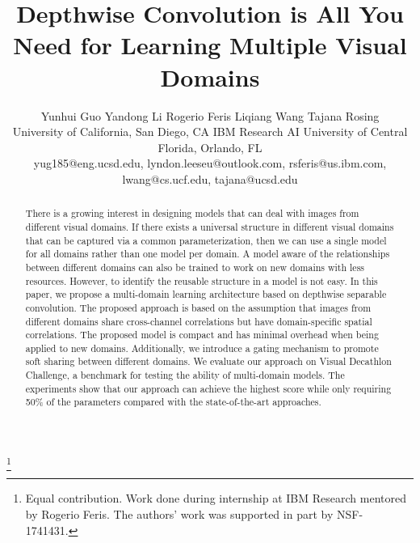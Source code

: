 \documentclass[letterpaper]{article} \usepackage{aaai19}  \usepackage{times}  \usepackage{helvet}  \usepackage{courier}  \usepackage{url}  \usepackage{graphicx}  \usepackage{amssymb}
\begin{document}
\title{Depthwise Convolution is All You Need for Learning Multiple Visual Domains}
\author{Yunhui Guo   \quad  Yandong Li   
\quad  Rogerio Feris   \quad Liqiang Wang \quad Tajana Rosing  \\
{University of California, San Diego, CA}   
\quad IBM Research AI 
\quad University of Central Florida,
Orlando, FL   \\
yug185@eng.ucsd.edu, lyndon.leeseu@outlook.com,
rsferis@us.ibm.com,
lwang@cs.ucf.edu,
tajana@ucsd.edu}
\maketitle
\begin{abstract}
There is a growing interest in designing models that can deal with images from different visual domains. If there exists a universal structure in different visual domains that can be captured via a common parameterization, then we can use a single model for all domains rather than one model per domain. A model aware of the relationships between different
domains can also be trained to work on new domains
with less resources. However, to identify the reusable structure in a model is not easy. In this paper, we propose a multi-domain learning architecture based on depthwise separable convolution. The proposed approach is based on the assumption that images from different domains share cross-channel correlations but have domain-specific spatial correlations. The proposed model is compact and has minimal overhead when being applied to new domains. Additionally, we introduce a gating mechanism to promote soft sharing between different domains. We evaluate our approach on Visual Decathlon Challenge, a benchmark for testing the ability of multi-domain models. The experiments show that our approach can achieve the highest score while only requiring 50\% of the parameters compared with the state-of-the-art approaches.
\end{abstract}
\let\thefootnote\relax\footnote{ Equal contribution. Work done during internship at IBM Research mentored by Rogerio Feris.  The authors' work was supported in part by NSF-1741431.}
\end{document}
